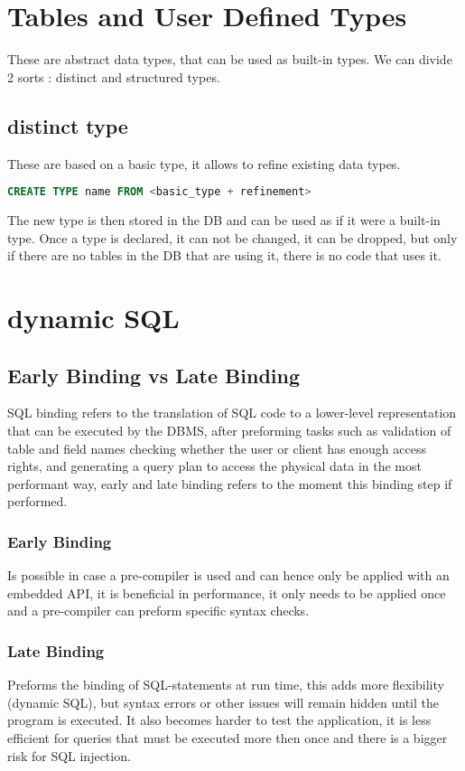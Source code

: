 \documentclass{report}
\begin{document}
		\section{Tables and User Defined Types}	
			These are abstract data types, that can be used as built-in types. We can divide 2 sorts : distinct and structured types. 
			\subsection{distinct type}
				These are based on a basic type, it allows to refine existing data types.
				\begin{lstlisting}[language = sql]
	CREATE TYPE name FROM <basic_type + refinement>\end{lstlisting}
				The new type is then stored in the DB and can be used as if it were a built-in type. Once a type is declared, it can not be changed, it can be dropped, but only if there are no tables in the DB that are using it, there is no code that uses it. 
		\section{dynamic SQL}
			\subsection{Early Binding vs Late Binding}
				SQL binding refers to the translation of SQL code to a lower-level representation that can be executed by the DBMS, after preforming tasks such as validation of table and field names checking whether the user or client has enough access rights, and generating a query plan to access the physical data in the most performant way, early and late binding refers to the moment this binding step if performed.
				\subsubsection{Early Binding}
					Is possible in case a pre-compiler is used and can hence only be applied with an embedded API, it is beneficial in performance, it only needs to be applied once and a pre-compiler can preform specific syntax checks. 
				\subsubsection{Late Binding}
					Preforms the binding of SQL-statements at run time, this adds more flexibility (dynamic SQL), but syntax errors or other issues will remain hidden until the program is executed. It also becomes harder to test the application, it is less efficient for queries that must be executed more then once and there is a bigger risk for SQL injection. 
\end{document}
